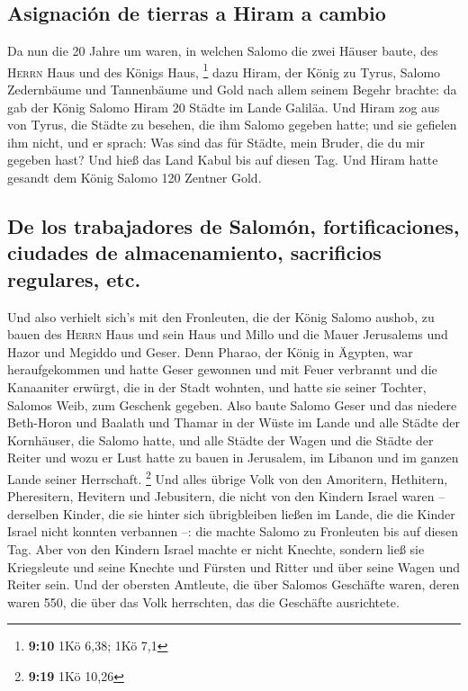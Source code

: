 \hypertarget{asignaciuxf3n-de-tierras-a-hiram-a-cambio}{%
\subsection{Asignación de tierras a Hiram a
cambio}\label{asignaciuxf3n-de-tierras-a-hiram-a-cambio}}

 Da nun die 20 Jahre um waren, in welchen Salomo die zwei
Häuser baute, des \textsc{Herrn} Haus und des Königs Haus, \footnote{\textbf{9:10}
  1Kö 6,38; 1Kö 7,1}  dazu Hiram, der König zu Tyrus,
Salomo Zedernbäume und Tannenbäume und Gold nach allem seinem Begehr
brachte: da gab der König Salomo Hiram 20 Städte im Lande Galiläa.
 Und Hiram zog aus von Tyrus, die Städte zu besehen, die
ihm Salomo gegeben hatte; und sie gefielen ihm nicht, 
und er sprach: Was sind das für Städte, mein Bruder, die du mir gegeben
hast? Und hieß das Land Kabul bis auf diesen Tag.  Und
Hiram hatte gesandt dem König Salomo 120 Zentner Gold.

\hypertarget{de-los-trabajadores-de-salomuxf3n-fortificaciones-ciudades-de-almacenamiento-sacrificios-regulares-etc.}{%
\subsection{De los trabajadores de Salomón, fortificaciones, ciudades de
almacenamiento, sacrificios regulares,
etc.}\label{de-los-trabajadores-de-salomuxf3n-fortificaciones-ciudades-de-almacenamiento-sacrificios-regulares-etc.}}

 Und also verhielt sich's mit den Fronleuten, die der
König Salomo aushob, zu bauen des \textsc{Herrn} Haus und sein Haus und
Millo und die Mauer Jerusalems und Hazor und Megiddo und Geser.
 Denn Pharao, der König in Ägypten, war heraufgekommen
und hatte Geser gewonnen und mit Feuer verbrannt und die Kanaaniter
erwürgt, die in der Stadt wohnten, und hatte sie seiner Tochter, Salomos
Weib, zum Geschenk gegeben.  Also baute Salomo Geser und
das niedere Beth-Horon  und Baalath und Thamar in der
Wüste im Lande  und alle Städte der Kornhäuser, die
Salomo hatte, und alle Städte der Wagen und die Städte der Reiter und
wozu er Lust hatte zu bauen in Jerusalem, im Libanon und im ganzen Lande
seiner Herrschaft. \footnote{\textbf{9:19} 1Kö 10,26} 
Und alles übrige Volk von den Amoritern, Hethitern, Pheresitern,
Hevitern und Jebusitern, die nicht von den Kindern Israel waren --
 derselben Kinder, die sie hinter sich übrigbleiben
ließen im Lande, die die Kinder Israel nicht konnten verbannen --: die
machte Salomo zu Fronleuten bis auf diesen Tag.  Aber von
den Kindern Israel machte er nicht Knechte, sondern ließ sie Kriegsleute
und seine Knechte und Fürsten und Ritter und über seine Wagen und Reiter
sein.  Und der obersten Amtleute, die über Salomos
Geschäfte waren, deren waren 550, die über das Volk herrschten, das die
Geschäfte ausrichtete.

